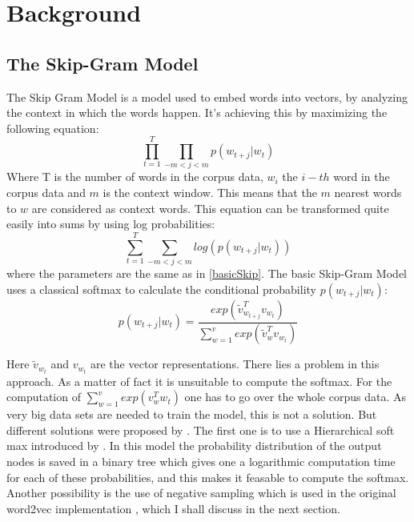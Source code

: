\chapter{Background}\label{chap:background}

\section{The Skip-Gram Model} 
The Skip Gram Model is a model used to embed words into vectors, by analyzing the context in which the words happen. It's achieving this by maximizing the following equation:\begin{equation} \label{basicSkip} \prod_{t=1}^T \prod_{-m<j<m}  p(w_{t+j}|w_t) \end{equation} Where T is the number of words in the corpus data, $w_i$ the $i-th$ word in the corpus data and $m$ is the context window. This means that the $m$ nearest words to $w$ are considered as context words.
This equation can be transformed quite easily into sums by using log probabilities: 
\begin{equation} \sum _{t=1}^T \sum_{-m<j<m} log( p(w_{t+j}|w_t) )\end{equation} 
    where the parameters are the same as in \ref{basicSkip}. The basic Skip-Gram Model uses a classical softmax to calculate the conditional probability $p(w_{t+j}|w_t)$: 
   \begin{equation}
   p(w_{t+j}|w_t)=  \frac{exp( \tilde{v}_{w_{t+j}}^Tv_{w_t})}{\sum_{w=1}^v exp(\tilde{v}_w^Tv_{ w_t})}
   \end{equation}
  
  Here $\tilde{v}_{w_t}$ and $ v_{w_t}$ are the vector representations.  There lies a problem in this approach. As a matter of fact it is unsuitable to compute the softmax. For the computation of $\sum_{w=1}^v exp(v_w^T w_t)$ one has to go over the whole corpus data. As very big data sets are needed to train the model, this is not a solution. But different solutions were proposed by \cite{mikolov2}. The first one is to use a Hierarchical soft max introduced by \cite{hsoftmax}. In this model the probability distribution of the output nodes is saved in a binary tree which gives one a logarithmic computation time for each of these probabilities, and this makes it feasable to compute the softmax. Another possibility is the use of negative sampling which is used in the original word2vec implementation \cite{mikolov2}, which I shall discuss in the next section. 

